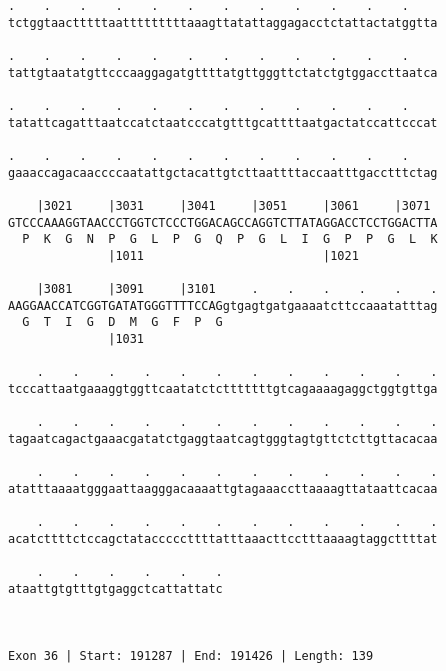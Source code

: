 \documentclass{article}
\begin{document}
\begin{Verbatim}
.    .    .    .    .    .    .    .    .    .    .    .    
tctggtaactttttaatttttttttaaagttatattaggagacctctattactatggtta
                                                            
.    .    .    .    .    .    .    .    .    .    .    .    
tattgtaatatgttcccaaggagatgttttatgttgggttctatctgtggaccttaatca
                                                            
.    .    .    .    .    .    .    .    .    .    .    .    
tatattcagatttaatccatctaatcccatgtttgcattttaatgactatccattcccat
                                                            
.    .    .    .    .    .    .    .    .    .    .    .    
gaaaccagacaaccccaatattgctacattgtcttaattttaccaatttgacctttctag
                                                            
    |3021     |3031     |3041     |3051     |3061     |3071 
GTCCCAAAGGTAACCCTGGTCTCCCTGGACAGCCAGGTCTTATAGGACCTCCTGGACTTA
  P  K  G  N  P  G  L  P  G  Q  P  G  L  I  G  P  P  G  L  K
              |1011                         |1021           
  
    |3081     |3091     |3101     .    .    .    .    .    .
AAGGAACCATCGGTGATATGGGTTTTCCAGgtgagtgatgaaaatcttccaaatatttag
  G  T  I  G  D  M  G  F  P  G                              
              |1031                                         
  
    .    .    .    .    .    .    .    .    .    .    .    .
tcccattaatgaaaggtggttcaatatctctttttttgtcagaaaagaggctggtgttga
                                                            
    .    .    .    .    .    .    .    .    .    .    .    .
tagaatcagactgaaacgatatctgaggtaatcagtgggtagtgttctcttgttacacaa
                                                            
    .    .    .    .    .    .    .    .    .    .    .    .
atatttaaaatgggaattaagggacaaaattgtagaaaccttaaaagttataattcacaa
                                                            
    .    .    .    .    .    .    .    .    .    .    .    .
acatcttttctccagctatacccccttttatttaaacttcctttaaaagtaggcttttat
                                                            
    .    .    .    .    .    .
ataattgtgtttgtgaggctcattattatc
                              
                              
 
Exon 36 | Start: 191287 | End: 191426 | Length: 139
 

\end{Verbatim}
\end{document}
